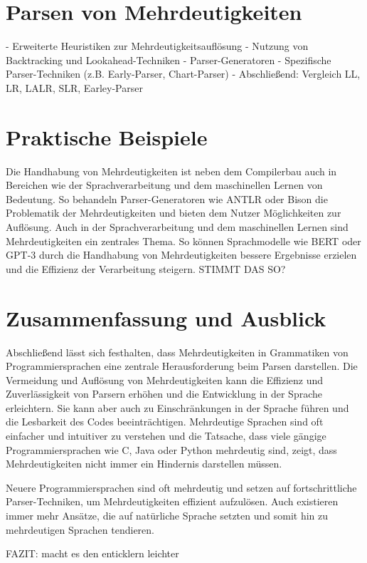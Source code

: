 \documentclass[runningheads]{llncs}
\begin{document}
	\section{Parsen von Mehrdeutigkeiten}

	- Erweiterte Heuristiken zur Mehrdeutigkeitsauflösung
	- Nutzung von Backtracking und Lookahead-Techniken
	- Parser-Generatoren
	- Spezifische Parser-Techniken (z.B. Early-Parser, Chart-Parser)
	- Abschließend: Vergleich LL, LR, LALR, SLR, Earley-Parser


	\section{Praktische Beispiele}

	Die Handhabung von Mehrdeutigkeiten ist neben dem Compilerbau
	auch in Bereichen wie der Sprachverarbeitung und dem maschinellen Lernen von Bedeutung.
	So behandeln Parser-Generatoren wie ANTLR oder Bison die Problematik der Mehrdeutigkeiten
	und bieten dem Nutzer Möglichkeiten zur Auflösung.
	Auch in der Sprachverarbeitung und dem maschinellen Lernen sind Mehrdeutigkeiten ein zentrales Thema.
	So können Sprachmodelle wie BERT oder GPT-3 durch die Handhabung von Mehrdeutigkeiten
	bessere Ergebnisse erzielen und die Effizienz der Verarbeitung steigern.
	STIMMT DAS SO?


	\section{Zusammenfassung und Ausblick}

	Abschließend lässt sich festhalten, dass Mehrdeutigkeiten in Grammatiken von Programmiersprachen
	eine zentrale Herausforderung beim Parsen darstellen.
	Die Vermeidung und Auflösung von Mehrdeutigkeiten kann die Effizienz und Zuverlässigkeit von Parsern erhöhen
	und die Entwicklung in der Sprache erleichtern.
	Sie kann aber auch zu Einschränkungen in der Sprache führen und die Lesbarkeit des Codes beeinträchtigen.
	Mehrdeutige Sprachen sind oft einfacher und intuitiver zu verstehen
	und die Tatsache, dass viele gängige Programmiersprachen wie C, Java oder Python mehrdeutig sind,
	zeigt, dass Mehrdeutigkeiten nicht immer ein Hindernis darstellen müssen.

	Neuere Programmiersprachen sind oft mehrdeutig und setzen auf fortschrittliche Parser-Techniken,
	um Mehrdeutigkeiten effizient aufzulösen.
	Auch existieren immer mehr Ansätze, die auf natürliche Sprache setzten
	und somit hin zu mehrdeutigen Sprachen tendieren.
	\cite{watrous2020,springer2013,wharton1976,watrous,parr,kemp1974,qi2018generalized,softwarelanguage,thorup1994}

	FAZIT: macht es den enticklern leichter


%
%
%
	
	
\end{document}
